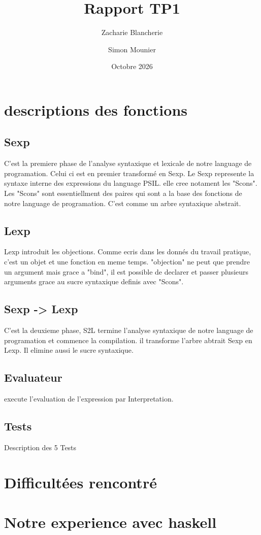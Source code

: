 \documentclass[12pt, a4paper]{article}
\title{Rapport TP1}
\author{Zacharie Blancherie \and Simon Mounier}
\date{Octobre 2026}
\begin{document}
\maketitle
\tableofcontents
\newpage

\section{descriptions des fonctions}

\subsection{Sexp}
C'est la premiere phase de l'analyse syntaxique et lexicale de notre language
de programation. Celui ci est en premier transformé en Sexp.
Le Sexp represente la syntaxe interne des expressions du language PSIL.
elle cree notament les "Scons". Les "Scons" sont essentiellment des paires 
qui sont a la base des fonctions de notre language de programation.
C'est comme un arbre syntaxique abstrait.

\subsection{Lexp}
Lexp introduit les objections. Comme ecris dans les donnés du travail 
pratique, c'est un objet et une fonction en meme temps. "objection" ne peut que 
prendre un argument mais grace a "bind", il est possible de declarer et passer
plusieurs arguments grace au sucre syntaxique definis avec "Scons".

\subsection{Sexp -> Lexp}
C'est la deuxieme phase, S2L termine l'analyse syntaxique de notre language
de programation et commence la compilation. il transforme l'arbre abtrait Sexp
en Lexp. Il elimine aussi le sucre syntaxique.


\subsection{Evaluateur}
execute l'evaluation de l'expression par Interpretation.
\subsection{Tests}
Description des 5 Tests

\section{Difficultées rencontré}

\section{Notre experience avec haskell}
\end{document}
